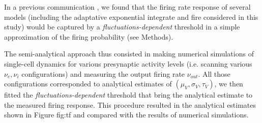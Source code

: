 \documentclass[8pt, colorlinks, a4paper]{article}
\renewcommand\ref{}
\begin{document}
In a previous communication \cite{Zerlaut2016}, we found that the firing
rate response of several models (including the adaptative exponential
integrate and fire considered in this study) would be captured by a
\emph{fluctuations-dependent} threshold in a simple approximation of the
firing probability (see Methods).

The semi-analytical approach thus consisted in making numerical
simulations of single-cell dynamics for various presynaptic activity
levels (i.e. scanning various \(\nu_e, \nu_i\) configurations) and
measuring the output firing rate \(\nu_{out}\). All those
configurations corresponded to analytical estimates of
\((\mu_V,\sigma_V,\tau_V)\), we then fitted the
\emph{fluctuations-dependent} threshold that bring the analytical estimate
to the measured firing response. This procedure resulted in the
analytical estimates shown in Figure \ref{fig:tf} and compared with the
results of numerical simulations.



\end{document}
